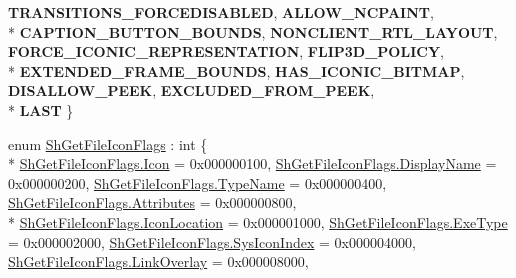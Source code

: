 \begin{DoxyCompactItemize}
{\bfseries T\-R\-A\-N\-S\-I\-T\-I\-O\-N\-S\-\_\-\-F\-O\-R\-C\-E\-D\-I\-S\-A\-B\-L\-E\-D}, 
{\bfseries A\-L\-L\-O\-W\-\_\-\-N\-C\-P\-A\-I\-N\-T}, 
\\*
{\bfseries C\-A\-P\-T\-I\-O\-N\-\_\-\-B\-U\-T\-T\-O\-N\-\_\-\-B\-O\-U\-N\-D\-S}, 
{\bfseries N\-O\-N\-C\-L\-I\-E\-N\-T\-\_\-\-R\-T\-L\-\_\-\-L\-A\-Y\-O\-U\-T}, 
{\bfseries F\-O\-R\-C\-E\-\_\-\-I\-C\-O\-N\-I\-C\-\_\-\-R\-E\-P\-R\-E\-S\-E\-N\-T\-A\-T\-I\-O\-N}, 
{\bfseries F\-L\-I\-P3\-D\-\_\-\-P\-O\-L\-I\-C\-Y}, 
\\*
{\bfseries E\-X\-T\-E\-N\-D\-E\-D\-\_\-\-F\-R\-A\-M\-E\-\_\-\-B\-O\-U\-N\-D\-S}, 
{\bfseries H\-A\-S\-\_\-\-I\-C\-O\-N\-I\-C\-\_\-\-B\-I\-T\-M\-A\-P}, 
{\bfseries D\-I\-S\-A\-L\-L\-O\-W\-\_\-\-P\-E\-E\-K}, 
{\bfseries E\-X\-C\-L\-U\-D\-E\-D\-\_\-\-F\-R\-O\-M\-\_\-\-P\-E\-E\-K}, 
\\*
{\bfseries L\-A\-S\-T}
 \}
\item 
enum \hyperlink{namespace_open_t_k_1_1_platform_1_1_windows_a515477a6b134fd1e396a53beb66b9f88}{Sh\-Get\-File\-Icon\-Flags} \-: int \{ \\*
\hyperlink{namespace_open_t_k_1_1_platform_1_1_windows_a515477a6b134fd1e396a53beb66b9f88a817434295a673aed431435658b65d9a7}{Sh\-Get\-File\-Icon\-Flags.\-Icon} = 0x000000100, 
\hyperlink{namespace_open_t_k_1_1_platform_1_1_windows_a515477a6b134fd1e396a53beb66b9f88a3b868ced6f60acf5ee565ac021d42941}{Sh\-Get\-File\-Icon\-Flags.\-Display\-Name} = 0x000000200, 
\hyperlink{namespace_open_t_k_1_1_platform_1_1_windows_a515477a6b134fd1e396a53beb66b9f88ae175f7206492c365397d33a0df9cc8d0}{Sh\-Get\-File\-Icon\-Flags.\-Type\-Name} = 0x000000400, 
\hyperlink{namespace_open_t_k_1_1_platform_1_1_windows_a515477a6b134fd1e396a53beb66b9f88a287234a1ff35a314b5b6bc4e5828e745}{Sh\-Get\-File\-Icon\-Flags.\-Attributes} = 0x000000800, 
\\*
\hyperlink{namespace_open_t_k_1_1_platform_1_1_windows_a515477a6b134fd1e396a53beb66b9f88a84e39f86e0843b752c3f58c1828e94df}{Sh\-Get\-File\-Icon\-Flags.\-Icon\-Location} = 0x000001000, 
\hyperlink{namespace_open_t_k_1_1_platform_1_1_windows_a515477a6b134fd1e396a53beb66b9f88ab8a206aa8eb60627304475f67b9f375a}{Sh\-Get\-File\-Icon\-Flags.\-Exe\-Type} = 0x000002000, 
\hyperlink{namespace_open_t_k_1_1_platform_1_1_windows_a515477a6b134fd1e396a53beb66b9f88a9b7da861f8f2e6c5f4b7caf079aa8bd6}{Sh\-Get\-File\-Icon\-Flags.\-Sys\-Icon\-Index} = 0x000004000, 
\hyperlink{namespace_open_t_k_1_1_platform_1_1_windows_a515477a6b134fd1e396a53beb66b9f88a887507c977779a51b9c3ecef7049f8e1}{Sh\-Get\-File\-Icon\-Flags.\-Link\-Overlay} = 0x000008000, 

\end{DoxyCompactItemize}
